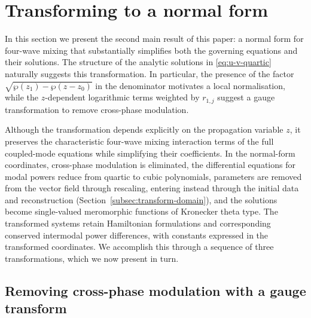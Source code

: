 \documentclass[11pt,a4paper]{article}
\numberwithin{equation}{section}
\begin{document}

\section{Transforming to a normal form} \label{sec:coord-transforms}

In this section we present the second main result of this paper: a normal form for four-wave mixing that substantially simplifies both the governing equations and their solutions.
The structure of the analytic solutions in \eqref{eq:u-v-quartic} naturally suggests this transformation.
In particular, the presence of the factor $\sqrt{\wp(z_1) - \wp(z - z_0)}$ in the denominator motivates a local normalisation, while the $z$-dependent logarithmic terms weighted by $r_{1,j}$ suggest a gauge transformation to remove cross-phase modulation.

Although the transformation depends explicitly on the propagation variable $z$, it preserves the characteristic four-wave mixing interaction terms of the full coupled-mode equations while simplifying their coefficients.
In the normal-form coordinates, cross-phase modulation is eliminated, the differential equations for modal powers reduce from quartic to cubic polynomials, parameters are removed from the vector field through rescaling, entering instead through the initial data and reconstruction (Section~\ref{subsec:transform-domain}), and the solutions become single-valued meromorphic functions of Kronecker theta type.
The transformed systems retain Hamiltonian formulations and corresponding conserved intermodal power differences, with constants expressed in the transformed coordinates.
We accomplish this through a sequence of three transformations, which we now present in turn.

\subsection{Removing cross-phase modulation with a gauge transform}
\end{document}
